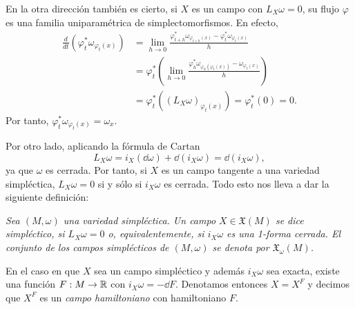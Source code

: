   En la otra dirección también es cierto, si $X$ es un campo con $L_X\omega=0$, su flujo $\varphi$ es una familia uniparamétrica de simplectomorfismos. 
  En efecto,
  \begin{align*}
    \frac{d}{dt}(\varphi^*_t\omega_{\varphi_t(x)})&=\lim_{h\rightarrow 0}\frac{\varphi^*_{t+h}\omega_{\varphi_{t+h}(x)}-\varphi^*_t\omega_{\varphi_t(x)}}{h}\\ &=\varphi^*_t\left( \lim_{h\rightarrow 0}\frac{\varphi^*_h\omega_{\varphi_h(\varphi_t(x))}-\omega_{\varphi_t(x)}}{h}\right)\\ &=\varphi_t^*((L_X\omega)_{\varphi_t(x)})=\varphi^*_t(0)=0. 
  \end{align*}
  Por tanto, $\varphi^*_t\omega_{\varphi_t(x)}=\omega_x$.

Por otro lado, aplicando la fórmula de Cartan
\begin{equation*}
  L_X\omega=i_X(\dd\omega)+\dd(i_X\omega)=\dd(i_X\omega),
\end{equation*}
ya que $\omega$ es cerrada. Por tanto, si $X$ es un campo tangente a una variedad simpléctica, $L_X\omega=0$ si y sólo si $i_X\omega$ es cerrada. Todo esto nos lleva a dar la siguiente definición:

\begin{defn}
  \em
  Sea $(M,\omega)$ una variedad simpléctica. Un campo $X\in \mathfrak{X}(M)$ se dice \emph{simpléctico}, si $L_X\omega=0$ o, equivalentemente, si $i_X\omega$ es una 1-forma cerrada. El conjunto de los campos simplécticos de $(M,\omega)$ se denota por $\mathfrak{X}_{\omega}(M)$.

  En el caso en que $X$ sea un campo simpléctico y además $i_X\omega$ sea exacta, existe una función $F:M\rightarrow \mathbb{R}$ con $i_X\omega=-\dd F$. Denotamos entonces $X=X^F$ y decimos que $X^F$ es un \emph{campo hamiltoniano} con hamiltoniano $F$.
\end{defn}

